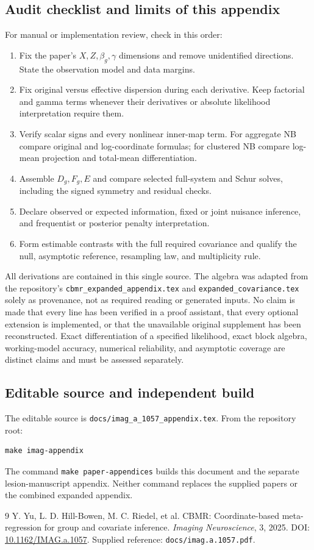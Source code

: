 \documentclass[11pt,a4paper]{article}
\numberwithin{equation}{section}
\begin{document}
\subsection{Audit checklist and limits of this appendix}
For manual or implementation review, check in this order:
\begin{enumerate}
 \item Fix the paper's $X,Z,\beta_g,\gamma$ dimensions and remove
 unidentified directions. State the observation model and data margins.
 \item Fix original versus effective dispersion during each derivative.
 Keep factorial and gamma terms whenever their derivatives or absolute
 likelihood interpretation require them.
 \item Verify scalar signs and every nonlinear inner-map term.
 For aggregate NB compare original and log-coordinate formulas;
 for clustered NB compare log-mean projection and total-mean differentiation.
 \item Assemble $D_g,F_g,E$ and compare selected full-system and
 Schur solves, including the signed symmetry and residual checks.
 \item Declare observed or expected information, fixed or joint nuisance
 inference, and frequentist or posterior penalty interpretation.
 \item Form estimable contrasts with the full required covariance and
 qualify the null, asymptotic reference, resampling law, and multiplicity rule.
\end{enumerate}
All derivations are contained in this single source.
The algebra was adapted from the repository's
\texttt{cbmr\_expanded\_appendix.tex} and
\texttt{expanded\_covariance.tex} solely as provenance, not as required reading
or generated inputs. No claim is made that every line has been verified
in a proof assistant, that every optional extension is implemented,
or that the unavailable original supplement has been reconstructed.
Exact differentiation of a specified likelihood, exact block algebra,
working-model accuracy, numerical reliability, and asymptotic coverage
are distinct claims and must be assessed separately.

\subsection{Editable source and independent build}
The editable source is \texttt{docs/imag\_a\_1057\_appendix.tex}.
From the repository root:
\begin{verbatim}
make imag-appendix
\end{verbatim}
The command \texttt{make paper-appendices} builds this document and
the separate lesion-manuscript appendix. Neither command replaces
the supplied papers or the combined expanded appendix.

\begin{thebibliography}{9}
Y. Yu, L. D. Hill-Bowen, M. C. Riedel, et al.
\newblock CBMR: Coordinate-based meta-regression for group and covariate inference.
\newblock \emph{Imaging Neuroscience}, 3, 2025.
\newblock DOI: \href{https://doi.org/10.1162/IMAG.a.1057}{10.1162/IMAG.a.1057}.
\newblock Supplied reference: \texttt{docs/imag.a.1057.pdf}.
\end{thebibliography}
\end{document}
